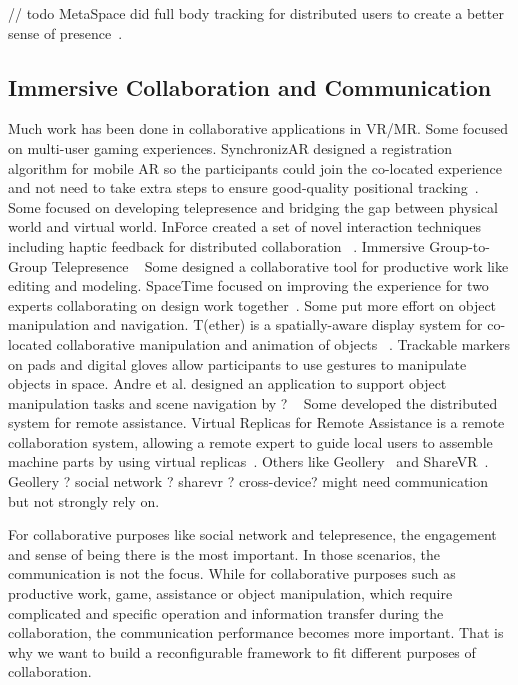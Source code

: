 \documentclass{sigchi}
\begin{document}
// todo
MetaSpace did full body tracking for distributed users to create a better sense of presence~\cite{sra2015metaspace}. 

\subsection{Immersive Collaboration and Communication}
Much work has been done in collaborative applications in VR/MR.
Some focused on multi-user gaming experiences. SynchronizAR designed a registration algorithm for mobile AR so the participants could join the co-located experience and not need to take extra steps to ensure good-quality positional tracking~\cite{huo2018synchronizar}.
Some focused on developing telepresence and bridging the gap between physical world and virtual world. InForce created a set of novel interaction techniques including haptic feedback for distributed collaboration ~\cite{nakagaki2019inforce}.
Immersive Group-to-Group Telepresence ~\cite{beck2013immersive}
Some designed a collaborative tool for productive work like editing and modeling. SpaceTime focused on improving the experience for two experts collaborating on design work together~\cite{xia2018spacetime}. 
Some put more effort on object manipulation and navigation.
T(ether) is a spatially-aware display system for co-located collaborative manipulation and animation of objects ~\cite{lakatos2014t}. Trackable markers on pads and digital gloves allow participants to use gestures to manipulate objects in space.
Andre et al. designed an application to support object manipulation tasks and scene navigation by ? ~\cite{kunert2019multi}
Some developed the distributed system for remote assistance.
Virtual Replicas for Remote Assistance is a remote collaboration system, allowing a remote expert to guide local users to assemble machine parts by using virtual replicas~\cite{oda2015virtual}.
Others like Geollery~\cite{du2019geollery, du2016social} and ShareVR~\cite{gugenheimer2017sharevr}. Geollery ? social network ? sharevr ? cross-device? might need communication but not strongly rely on.

For collaborative purposes like social network and telepresence, the engagement and sense of being there is the most important. In those scenarios, the communication is not the focus. While for collaborative purposes such as productive work, game, assistance or object manipulation, which require complicated and specific operation and information transfer during the collaboration, the communication performance becomes more important. That is why we want to build a reconfigurable framework to fit different purposes of collaboration.
\end{document}
